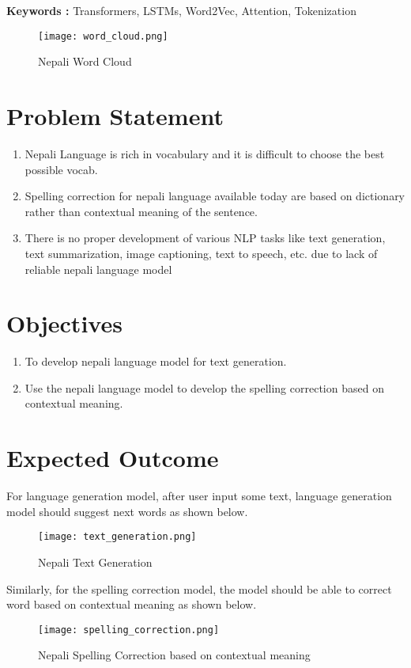 \textbf{Keywords : } Transformers, LSTMs, Word2Vec, Attention, Tokenization

\begin{figure}[H]
    \centering
    \texttt{[image: word\_cloud.png]}
    \caption{Nepali Word Cloud}
    \label{fig:Nepali Word Cloud}
\end{figure}

\section{Problem Statement}
\begin{enumerate}
    \item Nepali Language is rich in vocabulary and it is difficult to choose the best possible vocab.
    \item Spelling correction for nepali language available today are based on dictionary rather than contextual meaning of the sentence.
    \item There is no proper development of various NLP tasks like text generation, text summarization, image captioning, text to speech, etc. due to lack of reliable nepali language model
\end{enumerate}

\section{Objectives}
\begin{enumerate}
    \item To develop nepali language model for text generation.
    \item Use the nepali language model to develop the spelling correction based on contextual meaning.
\end{enumerate}


\section{Expected Outcome}
For language generation model, after user input some text, language generation model should suggest next words as shown below.

\begin{figure}[H]
    \centering
    \texttt{[image: text\_generation.png]}
    \caption{Nepali Text Generation}
    \label{fig:Nepali Text Generation}
\end{figure}

Similarly, for the spelling correction model, the model should be able to correct word based on contextual meaning as shown below.

\begin{figure}[H]
    \centering
    \texttt{[image: spelling\_correction.png]}
    \caption{Nepali Spelling Correction based on contextual meaning}
    \label{fig:Nepali Spelling Correction}
\end{figure}